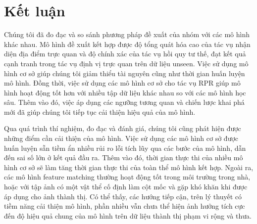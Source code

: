 \section{Kết luận}

Chúng tôi đã đo đạc và so sánh phương pháp đề xuất của nhóm với các mô hình khác nhau. Mô hình đề xuất kết hợp được độ tổng quát hóa cao của tác vụ nhận diện địa điểm trực quan và độ chính xác của tác vụ hồi quy tư thế, đạt kết quả cạnh tranh trong tác vụ định vị trực quan trên dữ liệu unseen. Việc sử dụng mô hình cơ sở giúp chúng tôi giảm thiểu tài nguyên cũng như thời gian huấn luyện mô hình. Đồng thời, việc sử dụng các mô hình cơ sở cho tác vụ RPR giúp mô hình hoạt động tốt hơn với nhiều tập dữ liệu khác nhau so với các mô hình học sâu. Thêm vào đó, việc áp dụng các ngưỡng tương quan và chiến lược khai phá mới đã giúp chúng tôi tiếp tục cải thiện hiệu quả của mô hình.

Qua quá trình thí nghiệm, đo đạc và đánh giá, chúng tôi cũng phát hiện được những điểm cần cải thiện của mô hình. Việc sử dụng các mô hình cơ sở được huấn luyện sẵn tiềm ẩn nhiều rủi ro lỗi tích lũy qua các bước của mô hình, dẫn đến sai số lớn ở kết quả đầu ra. Thêm vào đó, thời gian thực thi của nhiều mô hình cơ sở sẽ làm tăng thời gian thực thi của toàn thể mô hình kết hợp. Ngoài ra, các mô hình feature matching thường hoạt động tốt trong môi trường trong nhà, hoặc với tập ảnh có một vật thể cố định làm cột mốc và gặp khó khăn khi được áp dụng cho ảnh thành thị. Có thể thấy, các hướng tiếp cận, trên lý thuyết có tiềm năng cải thiện mô hình, phần nhiều vẫn chưa thể hiện ảnh hưởng tích cực đến độ hiệu quả chung của mô hình trên dữ liệu thành thị phạm vi rộng và thưa.
